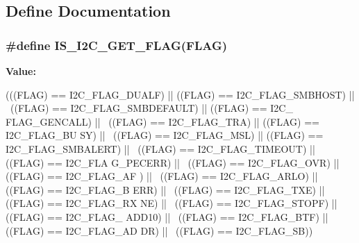 \subsection{Define Documentation}
\hypertarget{group__I2C__flags__definition_ga1a2c2a7c50cd8e33e532918106b4f6ce}{
\subsubsection[{IS\_\-I2C\_\-GET\_\-FLAG}]{\setlength{\rightskip}{0pt plus 5cm}\#define IS\_\-I2C\_\-GET\_\-FLAG(FLAG)}}
\label{group__I2C__flags__definition_ga1a2c2a7c50cd8e33e532918106b4f6ce}
{\bfseries Value:}
\begin{DoxyCode}
(((FLAG) == I2C_FLAG_DUALF) || ((FLAG) == I2C_FLAG_SMBHOST) || \
                               ((FLAG) == I2C_FLAG_SMBDEFAULT) || ((FLAG) == I2C_
      FLAG_GENCALL) || \
                               ((FLAG) == I2C_FLAG_TRA) || ((FLAG) == I2C_FLAG_BU
      SY) || \
                               ((FLAG) == I2C_FLAG_MSL) || ((FLAG) == 
      I2C_FLAG_SMBALERT) || \
                               ((FLAG) == I2C_FLAG_TIMEOUT) || ((FLAG) == I2C_FLA
      G_PECERR) || \
                               ((FLAG) == I2C_FLAG_OVR) || ((FLAG) == I2C_FLAG_AF
      ) || \
                               ((FLAG) == I2C_FLAG_ARLO) || ((FLAG) == I2C_FLAG_B
      ERR) || \
                               ((FLAG) == I2C_FLAG_TXE) || ((FLAG) == I2C_FLAG_RX
      NE) || \
                               ((FLAG) == I2C_FLAG_STOPF) || ((FLAG) == I2C_FLAG_
      ADD10) || \
                               ((FLAG) == I2C_FLAG_BTF) || ((FLAG) == I2C_FLAG_AD
      DR) || \
                               ((FLAG) == I2C_FLAG_SB))
\end{DoxyCode}

